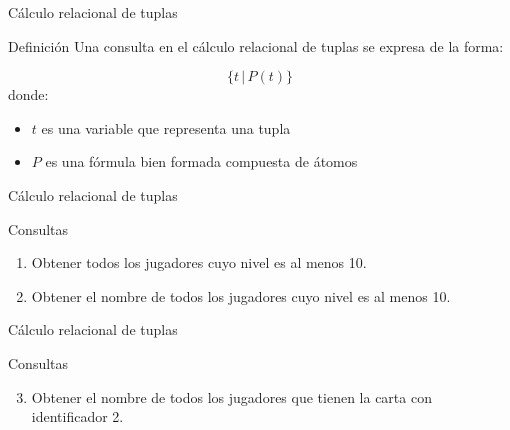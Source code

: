 \begin{frame}{C\'alculo relacional de tuplas}
    \begin{block}{Definici\'on}
        Una consulta en el c\'alculo relacional de tuplas se expresa
        de la forma:

        $$
            \{t \,|\, P(t)\}
        $$
        donde: \begin{itemize}
            \item $t$ es una variable que representa una tupla
            \item $P$ es una f\'ormula bien formada compuesta de \'atomos
        \end{itemize}
    \end{block}
\end{frame}






\begin{frame}{C\'alculo relacional de tuplas}

    \begin{block}{Consultas}
        \begin{enumerate}
            \item Obtener todos los jugadores cuyo nivel es al menos 10.
            \item<3-> Obtener el nombre de todos los jugadores cuyo nivel es al menos 10.
        \end{enumerate}
    \end{block}

\end{frame}


\begin{frame}{C\'alculo relacional de tuplas}
 
    \begin{block}{Consultas}
        \begin{enumerate}
            \setcounter{enumi}{2}
            \item Obtener el nombre de todos los jugadores que tienen la carta con identificador 2.
                
            
        \end{enumerate}

        
        
    \end{block}

\end{frame}

